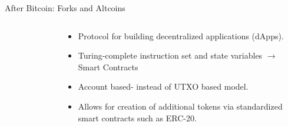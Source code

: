 \documentclass[]{beamer}
\begin{document}
\begin{frame}{After Bitcoin: Forks and Altcoins}
	\begin{columns}
			\begin{figure}
			\end{figure}
		\vspace{0.5em}
		\begin{small}
			\begin{itemize}
				\item Protocol for building decentralized applications (dApps).
				\item Turing-complete instruction set and state variables $\rightarrow$ Smart Contracts
				\item Account based- instead of UTXO based model.
				\item Allows for creation of additional tokens via standardized smart contracts such as ERC-20.
			\end{itemize}
		\end{small}
	\end{columns}	
\end{frame}
\end{document}
